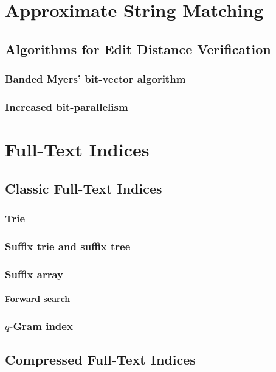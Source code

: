 \part{Approximate String Matching}


\chapter{Algorithms for Edit Distance Verification}
\section{Banded Myers' bit-vector algorithm}
\section{Increased bit-parallelism}

\part{Full-Text Indices}

\chapter{Classic Full-Text Indices}
\section{Trie}
\section{Suffix trie and suffix tree}
\section{Suffix array}
\subsection{Forward search}
\section{$q$-Gram index}

\chapter{Compressed Full-Text Indices}
